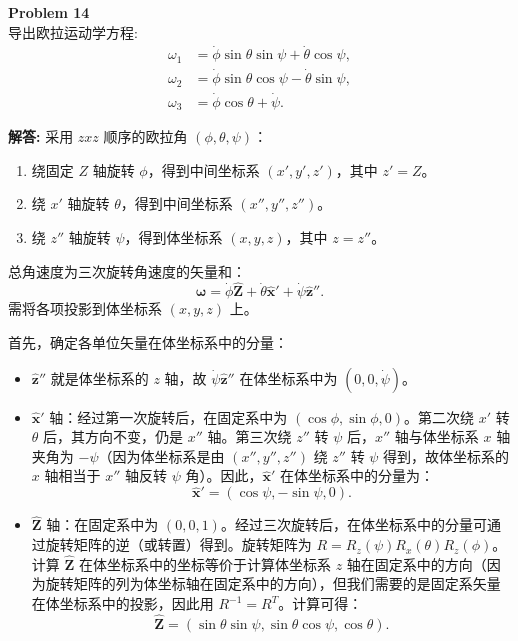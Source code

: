\documentclass[12pt, a4paper, oneside]{ctexart}
\newenvironment{solution}{\par\noindent\textbf{解答:}\quad}{\par}
\begin{document}
\begin{mdframed}[backgroundcolor=gray!10, linewidth=0pt]
    \textbf{Problem 14} \\
    导出欧拉运动学方程:
    \[
    \begin{aligned}
    \omega_1 &= \dot{\phi}\sin\theta\sin\psi + \dot{\theta}\cos\psi, \\
    \omega_2 &= \dot{\phi}\sin\theta\cos\psi - \dot{\theta}\sin\psi, \\
    \omega_3 &= \dot{\phi}\cos\theta + \dot{\psi}.
    \end{aligned}
    \]
\end{mdframed}
\begin{solution}
    采用 \(zxz\) 顺序的欧拉角 \((\phi, \theta, \psi)\)：
    \begin{enumerate}
        \item 绕固定 \(Z\) 轴旋转 \(\phi\)，得到中间坐标系 \((x', y', z')\)，其中 \(z'=Z\)。
        \item 绕 \(x'\) 轴旋转 \(\theta\)，得到中间坐标系 \((x'', y'', z'')\)。
        \item 绕 \(z''\) 轴旋转 \(\psi\)，得到体坐标系 \((x, y, z)\)，其中 \(z = z''\)。
    \end{enumerate}
    
    总角速度为三次旋转角速度的矢量和：
    \[
    \boldsymbol{\omega} = \dot{\phi} \hat{\mathbf{Z}} + \dot{\theta} \hat{\mathbf{x}}' + \dot{\psi} \hat{\mathbf{z}}''.
    \]
    需将各项投影到体坐标系 \((x, y, z)\) 上。
    
    首先，确定各单位矢量在体坐标系中的分量：
    \begin{itemize}
        \item \(\hat{\mathbf{z}}''\) 就是体坐标系的 \(z\) 轴，故 \(\dot{\psi} \hat{\mathbf{z}}''\) 在体坐标系中为 \((0, 0, \dot{\psi})\)。
        \item \(\hat{\mathbf{x}}'\) 轴：经过第一次旋转后，在固定系中为 \((\cos\phi, \sin\phi, 0)\)。第二次绕 \(x'\) 转 \(\theta\) 后，其方向不变，仍是 \(x''\) 轴。第三次绕 \(z''\) 转 \(\psi\) 后，\(x''\) 轴与体坐标系 \(x\) 轴夹角为 \(-\psi\)（因为体坐标系是由 \((x'', y'', z'')\) 绕 \(z''\) 转 \(\psi\) 得到，故体坐标系的 \(x\) 轴相当于 \(x''\) 轴反转 \(\psi\) 角）。因此，\(\hat{\mathbf{x}}'\) 在体坐标系中的分量为：
        \[
        \hat{\mathbf{x}}' = (\cos\psi, -\sin\psi, 0).
        \]
        \item \(\hat{\mathbf{Z}}\) 轴：在固定系中为 \((0,0,1)\)。经过三次旋转后，在体坐标系中的分量可通过旋转矩阵的逆（或转置）得到。旋转矩阵为 \(R = R_z(\psi) R_x(\theta) R_z(\phi)\)。计算 \(\hat{\mathbf{Z}}\) 在体坐标系中的坐标等价于计算体坐标系 \(z\) 轴在固定系中的方向（因为旋转矩阵的列为体坐标轴在固定系中的方向），但我们需要的是固定系矢量在体坐标系中的投影，因此用 \(R^{-1} = R^T\)。计算可得：
        \[
        \hat{\mathbf{Z}} = (\sin\theta \sin\psi, \sin\theta \cos\psi, \cos\theta).
        \]
    \end{itemize}
    

\end{solution}
\end{document}
